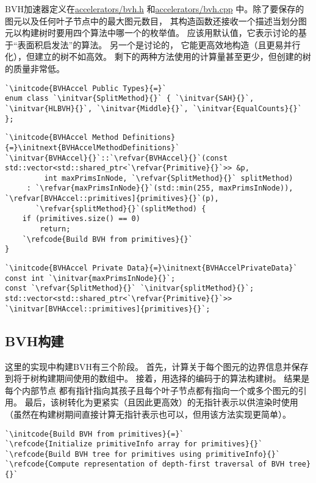 BVH加速器{}定义在\href{https://github.com/mmp/pbrt-v3/tree/master/src/accelerators/bvh.h}{\ttfamily accelerators/bvh.h}
和\href{https://github.com/mmp/pbrt-v3/tree/master/src/accelerators/bvh.cpp}{\ttfamily accelerators/bvh.cpp}
中。除了要保存的图元以及任何叶子节点中的最大图元数目，
其构造函数还接收一个描述当划分图元以构建树时要用四个算法中哪一个的枚举值。
应该用默认值，它表示讨论的基于“表面积启发法”的算法。
另一个是讨论的，
它能更高效地构造（且更易并行化），但建立的树不如高效。
剩下的两种方法使用的计算量甚至更少，但创建的树的质量非常低。
\begin{lstlisting}
`\initcode{BVHAccel Public Types}{=}`
enum class `\initvar{SplitMethod}{}` { `\initvar{SAH}{}`, `\initvar{HLBVH}{}`, `\initvar{Middle}{}`, `\initvar{EqualCounts}{}` };
\end{lstlisting}
\begin{lstlisting}
`\initcode{BVHAccel Method Definitions}{=}\initnext{BVHAccelMethodDefinitions}`
`\initvar{BVHAccel}{}`::`\refvar{BVHAccel}{}`(const std::vector<std::shared_ptr<`\refvar{Primitive}{}`>> &p,
         int maxPrimsInNode, `\refvar{SplitMethod}{}` splitMethod)
     : `\refvar{maxPrimsInNode}{}`(std::min(255, maxPrimsInNode)), `\refvar[BVHAccel::primitives]{primitives}{}`(p),
       `\refvar{splitMethod}{}`(splitMethod) {
    if (primitives.size() == 0)
        return;
    `\refcode{Build BVH from primitives}{}`
}
\end{lstlisting}
\begin{lstlisting}
`\initcode{BVHAccel Private Data}{=}\initnext{BVHAccelPrivateData}`
const int `\initvar{maxPrimsInNode}{}`;
const `\refvar{SplitMethod}{}` `\initvar{splitMethod}{}`;
std::vector<std::shared_ptr<`\refvar{Primitive}{}`>> `\initvar[BVHAccel::primitives]{primitives}{}`;
\end{lstlisting}

\subsection{BVH构建}\label{sub:BVH构建}
这里的实现中构建BVH有三个阶段。
首先，计算关于每个图元的边界信息并保存到将于树构建期间使用的数组中。
接着，用选择的编码于的算法构建树。
结果是每个内部节点
都有指针指向其孩子且每个叶子节点都有指向一个或多个图元的引用。
最后，该树转化为更紧实（且因此更高效）的无指针表示以供渲染时使用
（虽然在构建树期间直接计算无指针表示也可以，但用该方法实现更简单）。
\begin{lstlisting}
`\initcode{Build BVH from primitives}{=}`
`\refcode{Initialize primitiveInfo array for primitives}{}`
`\refcode{Build BVH tree for primitives using primitiveInfo}{}`
`\refcode{Compute representation of depth-first traversal of BVH tree}{}`
\end{lstlisting}

